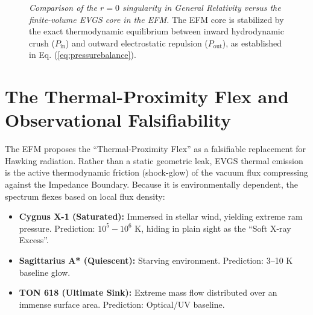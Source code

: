 \documentclass[11pt, a4paper]{article}
\begin{document}
\begin{figure}[!ht]
  \caption{\textit{Comparison of the $r=0$ singularity in General Relativity versus the finite-volume EVGS core in the EFM.} The EFM core is stabilized by the exact thermodynamic equilibrium between inward hydrodynamic crush ($P_{\text{in}}$) and outward electrostatic repulsion ($P_{\text{out}}$), as established in Eq. (\ref{eq:pressurebalance}).}
  \label{fig:core_compare}
\end{figure}

\section{The Thermal-Proximity Flex and Observational Falsifiability}
The EFM proposes the ``Thermal-Proximity Flex'' as a falsifiable replacement for Hawking radiation. Rather than a static geometric leak, EVGS thermal emission is the active thermodynamic friction (shock-glow) of the vacuum flux compressing against the Impedance Boundary. Because it is environmentally dependent, the spectrum flexes based on local flux density:
\begin{itemize}
  \item \textbf{Cygnus X-1 (Saturated):} Immersed in stellar wind, yielding extreme ram pressure. Prediction: $10^5 - 10^6$ K, hiding in plain sight as the ``Soft X-ray Excess''.
  \item \textbf{Sagittarius A* (Quiescent):} Starving environment. Prediction: 3--10 K baseline glow. 
  \item \textbf{TON 618 (Ultimate Sink):} Extreme mass flow distributed over an immense surface area. Prediction: Optical/UV baseline.
\end{itemize}
\end{document}
